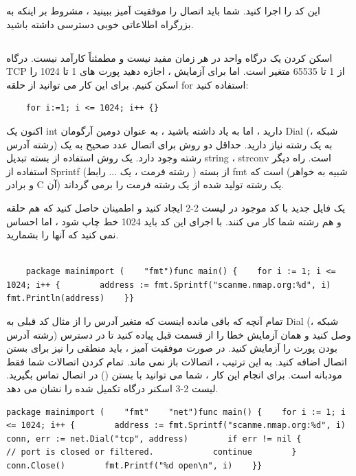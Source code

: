 \documentclass[12pt]{book}
\begin{document}
این کد را اجرا کنید. شما باید اتصال را موفقیت آمیز ببینید ، مشروط بر اینکه به بزرگراه اطلاعاتی خوبی دسترسی داشته باشید.
\subsection{}
اسکن کردن یک درگاه واحد در هر زمان مفید نیست و مطمئناً کارآمد نیست. درگاه TCP از 1 تا 65535 متغیر است. اما برای آزمایش ، اجازه دهید پورت های 1 تا 1024 را اسکن کنیم. برای این کار می توانید از حلقه for استفاده کنید:
\begin{latin}
	\begin{lstlisting}
	for i:=1; i <= 1024; i++ {}
	\end{lstlisting}
\end{latin}

اکنون یک int دارید ، اما به یاد داشته باشید ، به عنوان دومین آرگومان Dial (شبکه ، رشته آدرس) به یک رشته نیاز دارید. حداقل دو روش برای اتصال عدد صحیح به یک رشته وجود دارد. یک روش استفاده از بسته تبدیل string ، strconv است. راه دیگر استفاده از Sprintf (رشته فرمت ، یک ... رابط {}) از بسته fmt است که (شبیه به خواهر و برادر C آن) یک رشته تولید شده از یک رشته فرمت را برمی گرداند.

یک فایل جدید با کد موجود در لیست 2-2 ایجاد کنید و اطمینان حاصل کنید که هم حلقه و هم رشته شما کار می کنند. با اجرای این کد باید 1024 خط چاپ شود ، اما احساس نمی کنید که آنها را بشمارید.
\begin{latin}
	\begin{lstlisting}[caption={ Scanning 1024 ports of scanme.nmap.org (https://github.com/blackhat-go/bhg/ch-2/tcp-scanner-slow/main.go/)},captionpos=b]

	package mainimport (    "fmt")func main() {    for i := 1; i <= 1024; i++ {        address := fmt.Sprintf("scanme.nmap.org:%d", i)        fmt.Println(address)    }}
	\end{lstlisting}
\end{latin}

تمام آنچه که باقی مانده اینست که متغیر آدرس را از مثال کد قبلی به Dial (شبکه ، رشته آدرس) وصل کنید و همان آزمایش خطا را از قسمت قبل پیاده کنید تا در دسترس بودن پورت را آزمایش کنید. در صورت موفقیت آمیز ، باید منطقی را نیز برای بستن اتصال اضافه کنید. به این ترتیب ، اتصالات باز نمی ماند. تمام کردن اتصالات شما فقط مودبانه است. برای انجام این کار ، شما می توانید با بستن () در اتصال تماس بگیرید. لیست 2-3 اسکنر درگاه تکمیل شده را نشان می دهد.
\begin{latin}
	\begin{lstlisting}[caption={ The completed port scanner (https://github.com/blackhat-go/bhg/ch-2/tcp-scanner-slow/main.go/)},captionpos=b]
	package mainimport (    "fmt"    "net")func main() {    for i := 1; i <= 1024; i++ {        address := fmt.Sprintf("scanme.nmap.org:%d", i)        conn, err := net.Dial("tcp", address)        if err != nil {            // port is closed or filtered.            continue        }        conn.Close()        fmt.Printf("%d open\n", i)    }}
	\end{lstlisting}
\end{latin}
\end{document}
